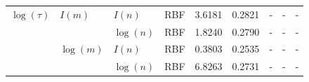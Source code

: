 \begin{table}
\begin{tabularx}{1\textwidth}{|llllrr >{\raggedright\arraybackslash}X>{\raggedright\arraybackslash}X>{\raggedright\arraybackslash}X|}
    $\log({\tau})$ & $I({m})$ & $I({n})$ & RBF &  3.6181 & 0.2821 &           - &           - &            - \\
                   &             & $\log({n})$ & RBF &  1.8240 & 0.2790 &           - &           - &            - \\
                   & $\log({m})$ & $I({n})$ & RBF &  0.3803 & 0.2535 &           - &           - &            - \\
                   &             & $\log({n})$ & RBF &  6.8263 & 0.2731 &           - &           - &            - \\
    \hline
    \end{tabularx}
\end{table}